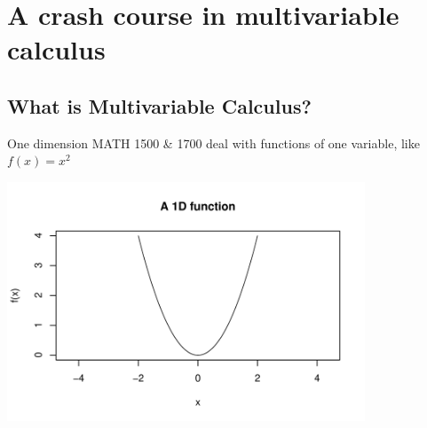 \documentclass[aspectratio=169]{beamer}\usepackage[]{graphicx}\usepackage[]{xcolor}
\newenvironment{knitrout}{}{} %
\begin{document}
\section{A crash course in multivariable calculus}


\subsection{What is Multivariable Calculus?}

\begin{frame}{One dimension}
MATH 1500 \& 1700 deal with functions of one variable, like $f(x) = x^2$
\begin{center}
\begin{knitrout}
\color{fgcolor}
\includegraphics[width=0.8\textwidth]{FIGS/L04-fig1d-1} 
\end{knitrout}
\end{center}
\end{frame}
\end{document}
